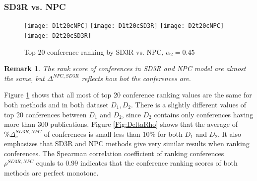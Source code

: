 \documentclass[10pt,leqno,twoside]{article}
\newtheorem{remark}{\indent Remark}[section]
\begin{document}
\subsubsection{SD3R vs. NPC}
%
\begin{figure} %
	\caption{Top 20 conference ranking by SD3R vs. NPC, $\alpha_2=0.45$}
	\label{Fig:Top20Conference}
    \centering
    \texttt{[image: D1t20cNPC]}
    \texttt{[image: D1t20cSD3R]}
    \texttt{[image: D2t20cNPC]}
    \texttt{[image: D2t20cSD3R]}
\end{figure}

\begin{remark}
The rank score of conferences in SD3R and NPC model are almost the same, but $\Delta^{NPC,SD3R}$ reflects how hot the conferences are.
\end{remark}

Figure \ref{Fig:Top20Conference} shows that all most of top 20 conference ranking values are the same for both methods and in both dataset $D_1, D_2$. There is a slightly different values of top 20 conferences between $D_1$ and $D_2$, since $D_2$ contains only conferences having more than 300 publications. 
Figure \ref{Fig:DeltaRho} shows that the average of $\%\Delta^{SD3R, NPC}_c$ of conferences is small less than $10\%$ for both $D_1$ and $D_2$. It also emphasizes that SD3R and NPC methods give very similar results when ranking conferences.
The Spearman correlation coefficient of ranking conferences $\rho^{SD3R,NPC}$ equals to $0.99$ indicates that the conference ranking scores of both methods are perfect monotone.
\end{document}
